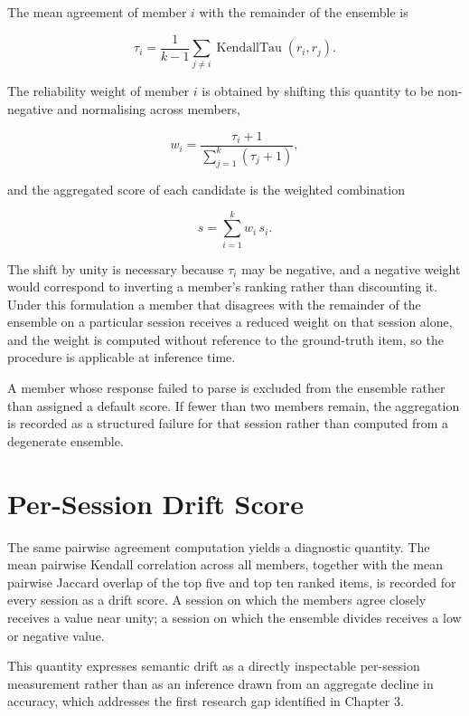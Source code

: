 \documentclass[12pt,a4paper,oneside]{report}
\begin{document}
The mean agreement of member $i$ with the remainder of the ensemble is

\begin{equation}
\tau_i = \frac{1}{k-1}\sum_{j \neq i} \operatorname{KendallTau}(r_i, r_j).
\end{equation}

The reliability weight of member $i$ is obtained by shifting this quantity to be
non-negative and normalising across members,

\begin{equation}
w_i = \frac{\tau_i + 1}{\sum_{j=1}^{k} (\tau_j + 1)},
\end{equation}

and the aggregated score of each candidate is the weighted combination

\begin{equation}
s = \sum_{i=1}^{k} w_i \, s_i .
\end{equation}

The shift by unity is necessary because $\tau_i$ may be negative, and a negative
weight would correspond to inverting a member's ranking rather than discounting
it. Under this formulation a member that disagrees with the remainder of the
ensemble on a particular session receives a reduced weight on that session
alone, and the weight is computed without reference to the ground-truth item, so
the procedure is applicable at inference time.

A member whose response failed to parse is excluded from the ensemble rather
than assigned a default score. If fewer than two members remain, the aggregation
is recorded as a structured failure for that session rather than computed from a
degenerate ensemble.

\section{Per-Session Drift Score}

The same pairwise agreement computation yields a diagnostic quantity. The mean
pairwise Kendall correlation across all members, together with the mean pairwise
Jaccard overlap of the top five and top ten ranked items, is recorded for every
session as a drift score. A session on which the members agree closely receives
a value near unity; a session on which the ensemble divides receives a low or
negative value.

This quantity expresses semantic drift as a directly inspectable per-session
measurement rather than as an inference drawn from an aggregate decline in
accuracy, which addresses the first research gap identified in Chapter 3.
\end{document}
